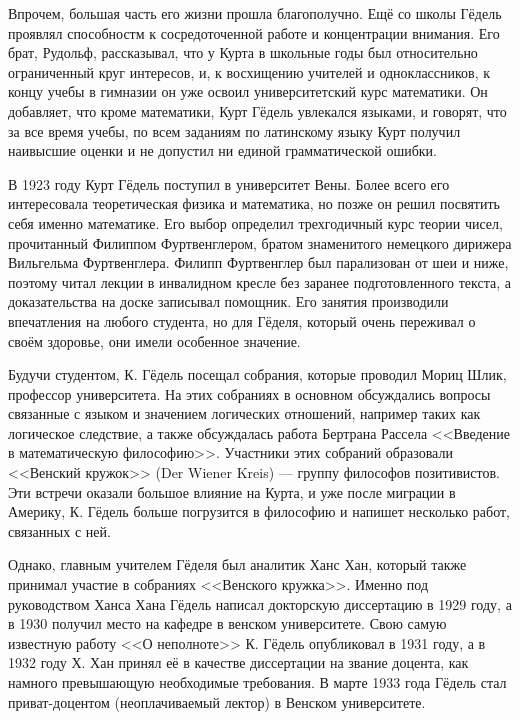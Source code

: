 \documentclass[specialist,
               substylefile = spbu.rtx,
               subf,href,colorlinks=true, 12pt]{disser}
\begin{document}
Впрочем, большая часть его жизни прошла благополучно. Ещё со школы Гёдель проявлял способностм к сосредоточенной работе и концентрации внимания. Его брат, Рудольф, рассказывал, что у Курта в школьные годы был относительно ограниченный круг интересов, и, к восхищению учителей и одноклассников, к концу учебы в гимназии он уже освоил университетский курс математики. Он добавляет, что кроме математики, Курт Гёдель увлекался языками, и говорят, что за все время учебы, по всем заданиям по латинскому языку Курт получил наивысшие оценки и не допустил ни единой грамматической ошибки.\par

В 1923 году Курт Гёдель поступил в университет Вены. Более всего его интересовала теоретическая физика и математика, но позже он решил посвятить себя именно математике. Его выбор определил трехгодичный курс теории чисел, прочитанный Филиппом Фуртвенглером, братом знаменитого немецкого дирижера Вильгельма Фуртвенглера. Филипп Фуртвенглер был парализован от шеи и ниже, поэтому читал лекции в инвалидном кресле без заранее подготовленного текста, а доказательства на доске записывал помощник.  Его занятия производили впечатления на любого студента, но для Гёделя, который очень переживал о своём здоровье, они имели особенное значение.\par

Будучи студентом, К. Гёдель посещал собрания, которые проводил Мориц Шлик, профессор университета. На этих собраниях в основном обсуждались вопросы связанные с языком и значением логических отношений, например таких как логическое следствие, а также обсуждалась работа Бертрана Рассела <<Введение в математическую философию>>. Участники этих собраний образовали <<Венский кружок>> (Der Wiener Kreis) --- группу философов позитивистов. Эти встречи оказали большое влияние на Курта, и уже после миграции в Америку, К. Гёдель больше погрузится в философию и напишет несколько работ, связанных с ней.\par

Однако, главным учителем Гёделя был аналитик Ханс Хан, который также принимал участие в собраниях <<Венского кружка>>. Именно под руководством Ханса Хана Гёдель написал докторскую диссертацию в 1929 году, а в 1930 получил место на кафедре в венском университете. Свою самую известную работу <<О неполноте>> К. Гёдель опубликовал в 1931 году, а в 1932 году Х. Хан принял её в качестве диссертации на звание доцента, как намного превышающую необходимые требования. В марте 1933 года Гёдель стал приват-доцентом (неоплачиваемый лектор) в Венском университете.\par
\end{document}
